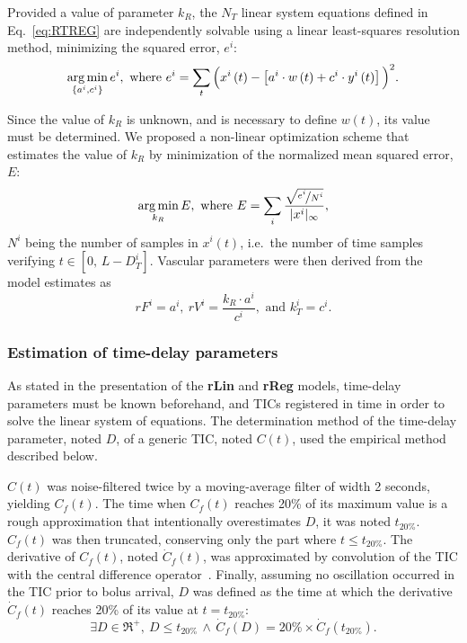 Provided a value of parameter $k_R$, the $N_T$ linear system equations defined in Eq.~\ref{eq:RTREG} are independently solvable using a linear least-squares resolution method, minimizing the squared error, $e^i$:
\begin{equation}
\operatorname*{arg\,min}_{\left\lbrace a^i, c^i \right\rbrace} e^i, \textrm{ where } e^i = \sum_{t} \Big( x^i\left(t\right) - \left[a^i\cdot w\left(t\right) + c^i\cdot y^i\left(t\right) \right] \Big)^2.
\end{equation}

Since the value of $k_R$ is unknown, and is necessary to define $w\left(t\right)$, its value must be determined.
We proposed a non-linear optimization scheme that estimates the value of $k_R$ by minimization of the normalized mean squared error, $E$:
\begin{equation}
\operatorname*{arg\,min}_{k_R} E, \textrm{ where } E = \sum_i\frac{\sqrt{\nicefrac{e^i}{N^i} }}{\lvert x^i \rvert_{\infty}},
\end{equation}
$N^i$ being the number of samples in $x^i(t)$, i.e.~the number of time samples verifying $t \in \left[0,\,L-D_T^i\right]$.
Vascular parameters were then derived from the model estimates as 
\begin{equation}
rF^i = a^i,~rV^i = \frac{k_R \cdot a^i}{c^i}, \textrm{ and } k_T^i = c^i.
\end{equation}

\subsubsection{Estimation of time-delay parameters}
As stated in the presentation of the \textbf{rLin} and \textbf{rReg} models, time-delay parameters must be known beforehand, and TICs registered in time in order to solve the linear system of equations.
The determination method of the time-delay parameter, noted $D$, of a generic TIC, noted $C\left(t\right)$, used the empirical method described below.

$C\left(t\right)$ was noise-filtered twice by a moving-average filter of width 2 seconds, yielding $C_f\left(t\right)$.
The time when $C_f\left(t\right)$ reaches 20\% of its maximum value is a rough approximation that intentionally overestimates $D$, it was noted $t_{20\%}$.
$C_f\left(t\right)$ was then truncated, conserving only the part where $t \leq t_{20\%}$.
The derivative of $C_{f}\left(t\right)$, noted $\dot{C}_{f}\left(t\right)$, was approximated by convolution of the TIC with the central difference operator~\cite{Whittaker:2008wv}. %
Finally, assuming no oscillation occurred in the TIC prior to bolus arrival, $D$ was defined as the time at which the derivative $\dot{C}_{f}\left(t\right)$ reaches 20\% of its value at $t = t_{20\%}$:
\begin{equation}
\exists D\in\Re^+,~D \leq t_{20\%}\,\wedge\,\dot{C}_{f}\left(D\right) = 20\% \times \dot{C}_{f}\left(t_{20\%}\right).
\end{equation}

